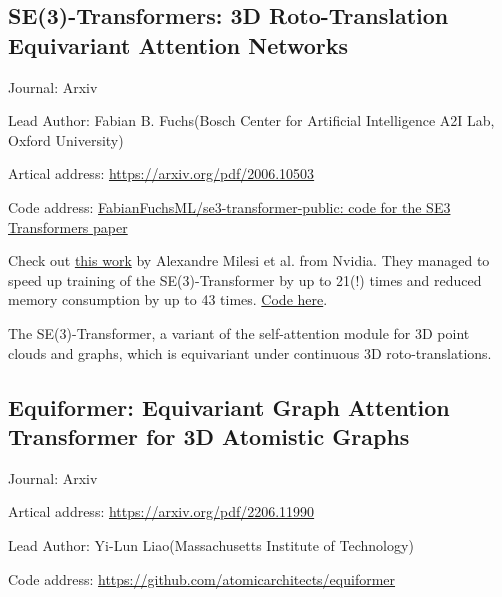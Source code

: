 \documentclass[11pt]{elegantbook}
\begin{document}
\subsection{SE(3)-Transformers: 3D Roto-Translation Equivariant Attention Networks}
\begin{brief}
    \item Journal: Arxiv
    \item Lead Author: Fabian B. Fuchs(Bosch Center for Artificial Intelligence A2I Lab, Oxford University)
    \item Artical address: \href{https://arxiv.org/pdf/2006.10503}{https://arxiv.org/pdf/2006.10503}
    \item Code address: \href{https://github.com/FabianFuchsML/se3-transformer-public}{FabianFuchsML/se3-transformer-public: code for the SE3 Transformers paper}
\end{brief}


Check out \href{https://developer.nvidia.com/blog/accelerating-se3-transformers-training-using-an-nvidia-open-source-model-implementation/}{this work} by Alexandre Milesi et al. from Nvidia. They managed to speed up training of the SE(3)-Transformer by up to 21(!) times and reduced memory consumption by up to 43 times. \href{https://github.com/NVIDIA/DeepLearningExamples/tree/master/DGLPyTorch/DrugDiscovery/SE3Transformer}{Code here}.

The SE(3)-Transformer, a variant of the self-attention module for 3D point clouds and graphs, which is equivariant under continuous 3D roto-translations.





\subsection{Equiformer: Equivariant Graph Attention Transformer for 3D Atomistic Graphs}
\begin{brief}
    \item Journal: Arxiv
    \item Artical address: \href{https://arxiv.org/pdf/2206.11990}{https://arxiv.org/pdf/2206.11990}
    \item Lead Author: Yi-Lun Liao(Massachusetts Institute of Technology)
    \item Code address: \href{https://github.com/atomicarchitects/equiformer}{https://github.com/atomicarchitects/equiformer}
\end{brief}
\end{document}
